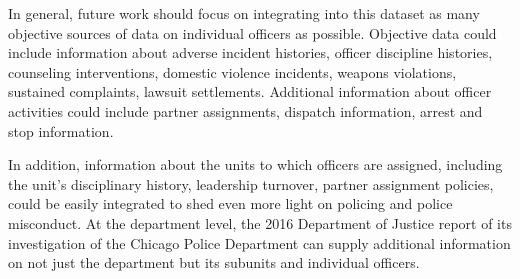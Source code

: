 In general, future work should focus on integrating into this dataset as many
objective sources of data on individual officers as possible. Objective data
could include information about adverse incident histories, officer discipline
histories, counseling interventions, domestic violence incidents, weapons
violations, sustained complaints, lawsuit settlements. Additional information
about officer activities could include partner assignments, dispatch
information, arrest and stop information. 

In addition, information about the units to which officers are assigned,
including the unit's disciplinary history, leadership turnover, partner
assignment policies, could be easily integrated to shed even more light on
policing and police misconduct. At the department level, the 2016 Department of
Justice report of its investigation of the Chicago Police Department can supply
additional information on not just the department but its subunits and
individual officers.

